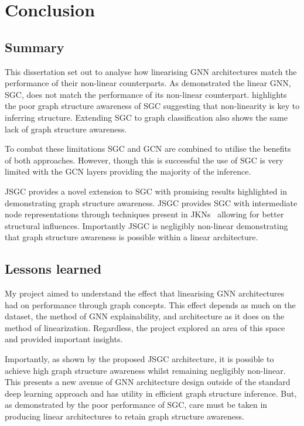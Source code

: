 \chapter{Conclusion}

\section{Summary}
This dissertation set out to analyse how linearising GNN architectures match the performance of their non-linear counterparts.
As  demonstrated the linear GNN, SGC, does not match the performance of its non-linear counterpart.
 highlights the poor graph structure awareness of SGC suggesting that non-linearity is key to inferring structure.
Extending SGC to graph classification also shows the same lack of graph structure awareness.

To combat these limitations SGC and GCN are combined to utilise the benefits of both approaches.
However, though this is successful the use of SGC is very limited with the GCN layers providing the majority of the inference.

JSGC provides a novel extension to SGC with promising results highlighted in  demonstrating graph structure awareness.
JSGC provides SGC with intermediate node representations through techniques present in JKNs~\cite{xu2018representation} allowing for better structural influences.
Importantly JSGC is negligibly non-linear demonstrating that graph structure awareness is possible within a linear architecture.

\section{Lessons learned}
My project aimed to understand the effect that linearising GNN architectures had on performance through graph concepts.
This effect depends as much on the dataset, the method of GNN explainability, and architecture as it does on the method of linearization.
Regardless, the project explored an area of this space and provided important insights.

Importantly, as shown by the proposed JSGC architecture, it is possible to achieve high graph structure awareness whilst remaining negligibly non-linear.
This presents a new avenue of GNN architecture design outside of the standard deep learning approach and has utility in efficient graph structure inference.
But, as demonstrated by the poor performance of SGC, care must be taken in producing linear architectures to retain graph structure awareness.

